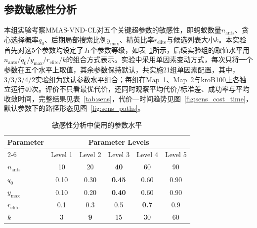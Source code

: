 \documentclass[lettersize,journal]{IEEEtran}
\begin{document}
\subsection{参数敏感性分析}
\label{subsec:exp_sens}
本组实验考察MMAS-VND-CL对五个关键超参数的敏感性，即蚂蚁数量$n_{\mathrm{ants}}$、贪心选择概率$q_0$、后期局部搜索比例$y_{\max}$、精英比率$r_{\mathrm{elite}}$与候选列表大小$k$。本实验首先对这5个参数均设定了五个参数等级，如表~\textcolor{blue}{\ref{tab:levels}}所示，后续实验组的取值水平用$n_{\mathrm{ants}}/q_0/y_{\max}/r_{\mathrm{elite}}/k$的组合方式表示。实验中采用单因素变动方式，每次只将一个参数在五个水平上取值，其余参数保持默认，共实施21组单因素配置，其中，3/3/3/4/2实验组为默认参数水平组合；每组在Map~1、Map~2与kroB100上各独立运行40次。评价不只看最优代价，还同时观察平均代价/标准差、成功率与平均收敛时间，完整结果见表~\textcolor{blue}{\ref{tab:sens}}，代价—时间趋势见图~\textcolor{blue}{\ref{fig:sens_cost_time}}，默认参数下的路径形态见图~\textcolor{blue}{\ref{fig:sens_paths}}。

\begin{table}[!ht]
\caption{敏感性分析中使用的参数水平}
\label{tab:levels}
\centering
\setlength{\tabcolsep}{4pt}
\begin{tabular}{lccccc}
\toprule
\multirow{2}{*}{Parameter} & \multicolumn{5}{c}{Parameter Levels} \\
\cmidrule(lr){2-6}
 & Level 1 & Level 2 & Level 3 & Level 4 & Level 5 \\
\midrule
$n_{\mathrm{ants}}$ & 10 & 20 & \textbf{40} & 60 & 90 \\
$q_0$ & 0.10 & 0.30 & \textbf{0.45} & 0.60 & 0.90 \\
$y_{\max}$ & 0.10 & 0.20 & \textbf{0.40} & 0.60 & 0.90 \\
$r_{\mathrm{elite}}$ & 0.1 & 0.3 & 0.5 & \textbf{0.7} & 0.9 \\
$k$ & 3 & \textbf{9} & 15 & 30 & 60 \\
\bottomrule
\end{tabular}
\end{table}
\end{document}
